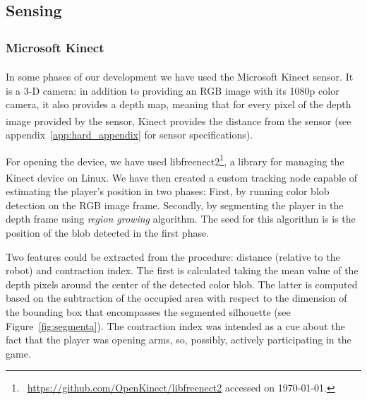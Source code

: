 \begin{figure}[ht]
      \label{fig:evolution}
\end{figure}

\subsection{Sensing}
\subsubsection{Microsoft Kinect\textsuperscript{\textregistered}\label{sec:kinectsec}}
In some phases of our development we have used the Microsoft Kinect\textsuperscript{\textregistered} sensor. It is a 3-D camera: in addition to providing an RGB image with its 1080p color camera, it also provides a depth map,  meaning that for every pixel of the depth image provided by the sensor, Kinect\textsuperscript{\textregistered} provides the distance from the sensor (see appendix~\ref{app:hard_appendix} for sensor specifications). 

For opening the device, we have used libfreenect2\footnote{~\url{https://github.com/OpenKinect/libfreenect2} accessed on \today.}, a library for managing the Kinect\textsuperscript{\textregistered} device on Linux. We have then created a custom tracking node capable of estimating the player's position in two phases: First, by running color blob detection on the RGB image frame. Secondly, by segmenting the player in the depth frame using \textit{region growing} algorithm. The seed for this algorithm is is the position of the blob detected in the first phase.

Two features could be extracted from the procedure: distance (relative to the robot) and contraction index. The first is calculated taking the mean value of the depth pixels around the center of the detected color blob. The latter is computed based on the subtraction of the occupied area with respect to the dimension of the bounding box that encompasses the segmented silhouette (see Figure~\ref{fig:segmenta}). The contraction index was intended as a cue about the fact that the player was opening arms, so, possibly, actively participating in the game.

